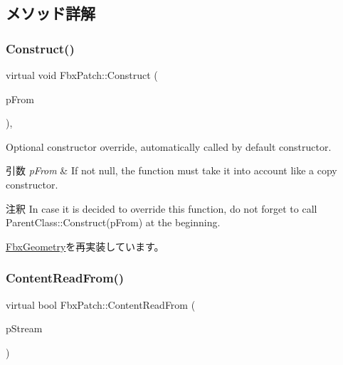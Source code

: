 \subsection{メソッド詳解}
\mbox{\label{class_fbx_patch_a82fbbc0a7ec019bbe69c976ab755b23e}} 
\subsubsection{\texorpdfstring{Construct()}{Construct()}}
{\footnotesize\ttfamily virtual void Fbx\+Patch\+::\+Construct (\begin{DoxyParamCaption}\item[{const \hyperlink{class_fbx_object}{Fbx\+Object} $\ast$}]{p\+From }\end{DoxyParamCaption})\hspace{0.3cm}{\ttfamily [protected]}, {\ttfamily [virtual]}}

Optional constructor override, automatically called by default constructor. 
\begin{DoxyParams}{引数}
{\em p\+From} & If not null, the function must take it into account like a copy constructor. \\
\hline
\end{DoxyParams}
\begin{DoxyRemark}{注釈}
In case it is decided to override this function, do not forget to call Parent\+Class\+::\+Construct(p\+From) at the beginning. 
\end{DoxyRemark}


\hyperlink{class_fbx_geometry_a26ca96a86f17783c45ff83b33d2b5324}{Fbx\+Geometry}を再実装しています。

\mbox{\label{class_fbx_patch_ad1aac4a2e0e820f27ff9a0123ba5756e}} 
\subsubsection{\texorpdfstring{Content\+Read\+From()}{ContentReadFrom()}}
{\footnotesize\ttfamily virtual bool Fbx\+Patch\+::\+Content\+Read\+From (\begin{DoxyParamCaption}\item[{const \hyperlink{class_fbx_stream}{Fbx\+Stream} \&}]{p\+Stream }\end{DoxyParamCaption})\hspace{0.3cm}{\ttfamily [virtual]}}

